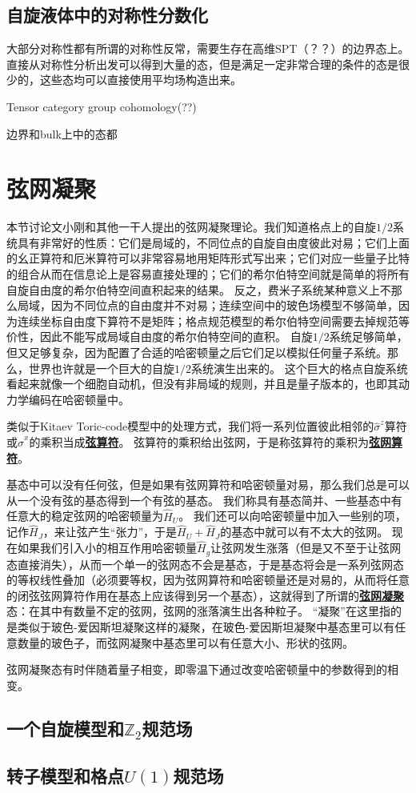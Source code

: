 \documentclass[hyperref, UTF8, a4paper]{ctexart}
\newcommand*{\concept}[1]{\underline{\textbf{#1}}}
\begin{document}
\subsection{自旋液体中的对称性分数化}

大部分对称性都有所谓的对称性反常，需要生存在高维SPT（？？）的边界态上。
直接从对称性分析出发可以得到大量的态，但是满足一定非常合理的条件的态是很少的，这些态均可以直接使用平均场构造出来。

Tensor category group cohomology(??)

边界和bulk上中的态都

\section{弦网凝聚}

本节讨论文小刚和其他一干人提出的弦网凝聚理论。我们知道格点上的自旋$1/2$系统具有非常好的性质：它们是局域的，不同位点的自旋自由度彼此对易；它们上面的幺正算符和厄米算符可以非常容易地用矩阵形式写出来；它们对应一些量子比特的组合从而在信息论上是容易直接处理的；它们的希尔伯特空间就是简单的将所有自旋自由度的希尔伯特空间直积起来的结果。
反之，费米子系统某种意义上不那么局域，因为不同位点的自由度并不对易；连续空间中的玻色场模型不够简单，因为连续坐标自由度下算符不是矩阵；格点规范模型的希尔伯特空间需要去掉规范等价性，因此不能写成局域自由度的希尔伯特空间的直积。
自旋$1/2$系统足够简单，但又足够复杂，因为配置了合适的哈密顿量之后它们足以模拟任何量子系统。那么，世界也许就是一个巨大的自旋$1/2$系统演生出来的。
这个巨大的格点自旋系统看起来就像一个细胞自动机，但没有非局域的规则，并且是量子版本的，也即其动力学编码在哈密顿量中。

类似于Kitaev Toric-code模型中的处理方式，我们将一系列位置彼此相邻的$\hat{\sigma}^z$算符或$\hat{\sigma}^x$的乘积当成\concept{弦算符}。
弦算符的乘积给出弦网，于是称弦算符的乘积为\concept{弦网算符}。

基态中可以没有任何弦，但是如果有弦网算符和哈密顿量对易，那么我们总是可以从一个没有弦的基态得到一个有弦的基态。
我们称具有基态简并、一些基态中有任意大的稳定弦网的哈密顿量为$\hat{H}_U$。
我们还可以向哈密顿量中加入一些别的项，记作$\hat{H}_J$，来让弦产生“张力”，于是$\hat{H}_U+\hat{H}_J$的基态中就可以有不太大的弦网。
现在如果我们引入小的相互作用哈密顿量$\hat{H}_g$让弦网发生涨落（但是又不至于让弦网态直接消失），从而一个单一的弦网态不会是基态，于是基态将会是一系列弦网态的等权线性叠加（必须要等权，因为弦网算符和哈密顿量还是对易的，从而将任意的闭弦弦网算符作用在基态上应该得到另一个基态），这就得到了所谓的\concept{弦网凝聚}态：在其中有数量不定的弦网，弦网的涨落演生出各种粒子。
“凝聚”在这里指的是类似于玻色-爱因斯坦凝聚这样的凝聚，在玻色-爱因斯坦凝聚中基态里可以有任意数量的玻色子，而弦网凝聚中基态里可以有任意大小、形状的弦网。

弦网凝聚态有时伴随着量子相变，即零温下通过改变哈密顿量中的参数得到的相变。

\subsection{一个自旋模型和$\mathbb{Z}_2$规范场}



\subsection{转子模型和格点$U(1)$规范场}

\subsection{}
\end{document}

